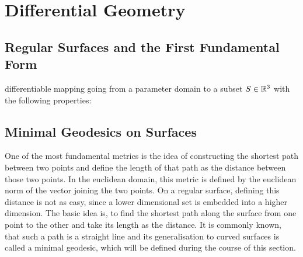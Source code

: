 \chapter{Differential Geometry}
\label{chapter:differentialGeometry}

\section{Regular Surfaces and the First Fundamental Form}
\begin{mydef}
	differentiable mapping going from a parameter domain to a subset $S \in \mathbb{R}^3$ with the following properties:
\end{mydef}
\section{Minimal Geodesics on Surfaces}
One of the most fundamental metrics is the idea of constructing the shortest path between two points and define the length of that path as the distance between those two points.
In the euclidean domain, this metric is defined by the euclidean norm of the vector joining the two points.
On a regular surface, defining this distance is not as easy, since a lower dimensional set is embedded into a higher dimension.
The basic idea is, to find the shortest path along the surface from one point to the other and take its length as the distance.
It is commonly known, that such a path is a straight line and its generalisation to curved surfaces is called a minimal geodesic, which will be defined during the course of this section.

